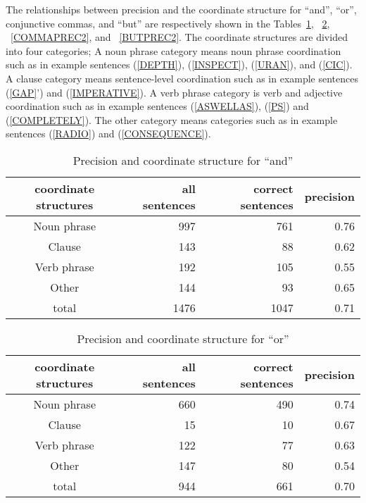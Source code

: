 The relationships between precision and the coordinate structure for ``and'',
``or'', conjunctive commas, and ``but'' are respectively shown in the
Tables~\ref{ANDPREC2}, ~\ref{ORPREC2}, ~\ref{COMMAPREC2}, and
~\ref{BUTPREC2}.
The coordinate structures are divided into four categories;
A noun phrase category means noun phrase coordination such as in example
sentences (\ref{DEPTH}),
(\ref{INSPECT}), (\ref{URAN}), and (\ref{CIC}).
A clause category means sentence-level coordination such as in
example sentences (\ref{GAP}') and (\ref{IMPERATIVE}).
A verb phrase category is verb and adjective coordination such as in
example sentences (\ref{ASWELLAS}), (\ref{PS}) and (\ref{COMPLETELY}).
The other category means categories such as in
example sentences (\ref{RADIO}) and (\ref{CONSEQUENCE}).

  \begin{table}
    \caption{Precision and coordinate structure for ``and''}
    \label{ANDPREC2}
    \begin{center}
      \begin{tabular}{|c|r|r|r|}
        \hline
coordinate structures  & all sentences & correct sentences & precision\\
        \hline
Noun phrase & 997 & 761 & 0.76 \\
Clause & 143 & 88 & 0.62 \\
Verb phrase & 192 & 105 & 0.55 \\
Other & 144 & 93 & 0.65 \\
        \hline
total & 1476 & 1047 & 0.71 \\
        \hline
      \end{tabular}
    \end{center}
  \end{table}

  \begin{table}
    \caption{Precision and coordinate structure for ``or''}
    \label{ORPREC2}
    \begin{center}
      \begin{tabular}{|c|r|r|r|}
        \hline
coordinate structures  & all sentences & correct sentences & precision\\
        \hline
Noun phrase & 660 & 490 & 0.74 \\
Clause & 15 & 10 & 0.67 \\
Verb phrase & 122 & 77 &  0.63 \\
Other & 147 & 80 & 0.54 \\
        \hline
total & 944 & 661 & 0.70 \\
        \hline
      \end{tabular}
    \end{center}
  \end{table}

